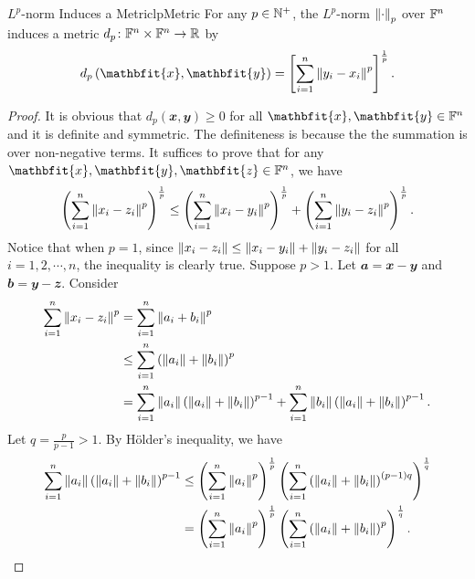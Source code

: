 \documentclass[math]{amznotes}
\theoremstyle{remark}
\begin{document}
\begin{probox}{$L^p$-norm Induces a Metric}{lpMetric}
    For any $p \in \mathbb{N}^+$, the $L^p$-norm ${\left\lVert {\cdot} \right\rVert}_p$ over $\mathbb{F}^n$ induces a metric $d_p \colon \mathbb{F}^n \times \mathbb{F}^n \to \mathbb{R}$ by 
    \begin{equation*}
        d_p\left(\mathbfit{x}, \mathbfit{y}\right) = \left[\sum_{i = 1}^{n}\norm{y_i - x_i}^p\right]^{\frac{1}{p}}.
    \end{equation*}
    \tcblower
    \begin{proof}
        It is obvious that $d_p\left(\mathbfit{x}, \mathbfit{y}\right) \geq 0$ for all $\mathbfit{x}, \mathbfit{y} \in \F^n$ and it is definite and symmetric. The definiteness is because the the summation is over non-negative terms. It suffices to prove that for any $\mathbfit{x}, \mathbfit{y}, \mathbfit{z} \in \F^n$, we have 
        \begin{equation*}
            \left( \sum_{i=1}^n {\left\lVert {x_i - z_i} \right\rVert}^p \right)^{\frac{1}{p}} \leq \left( \sum_{i=1}^n {\left\lVert {x_i - y_i} \right\rVert}^p \right)^{\frac{1}{p}} + \left( \sum_{i=1}^n {\left\lVert {y_i - z_i} \right\rVert}^p \right)^{\frac{1}{p}}.
        \end{equation*}
        Notice that when $p = 1$, since ${\left\lVert {x_i - z_i} \right\rVert} \leq {\left\lVert {x_i - y_i} \right\rVert} + {\left\lVert {y_i - z_i} \right\rVert} $ for all $i = 1, 2, \cdots, n$, the inequality is clearly true. Suppose $p > 1$. Let $\mathbfit{a} = \mathbfit{x} - \mathbfit{y}$ and $\mathbfit{b = y - z}$. Consider
        \begin{align*}
            \sum_{i=1}^n {\left\lVert {x_i - z_i} \right\rVert}^p & = \sum_{i=1}^n {\left\lVert {a_i + b_i} \right\rVert}^p \\
            & \leq \sum_{i=1}^n \left({\left\lVert {a_i} \right\rVert} + {\left\lVert {b_i} \right\rVert}\right)^p \\
            & = \sum_{i=1}^n {\left\lVert {a_i} \right\rVert}\left({\left\lVert {a_i} \right\rVert} + {\left\lVert {b_i} \right\rVert}\right)^{p - 1} + \sum_{i=1}^n {\left\lVert {b_i} \right\rVert}\left({\left\lVert {a_i} \right\rVert} + {\left\lVert {b_i} \right\rVert}\right)^{p - 1}.
        \end{align*}
        Let $q = \frac{p}{p - 1} > 1$. By H\"{o}lder's inequality, we have
        \begin{align*}
            \sum_{i=1}^n {\left\lVert {a_i} \right\rVert}\left({\left\lVert {a_i} \right\rVert} + {\left\lVert {b_i} \right\rVert}\right)^{p - 1} & \leq \left(\sum_{i=1}^n {\left\lVert {a_i} \right\rVert}^p\right)^{\frac{1}{p}}\left(\sum_{i = 1}^{n}\left({\left\lVert {a_i} \right\rVert} + {\left\lVert {b_i} \right\rVert}\right)^{\left(p - 1\right)q}\right)^{\frac{1}{q}} \\
            & = \left(\sum_{i=1}^n {\left\lVert {a_i} \right\rVert}^p\right)^{\frac{1}{p}}\left(\sum_{i = 1}^{n}\left({\left\lVert {a_i} \right\rVert} + {\left\lVert {b_i} \right\rVert}\right)^{p}\right)^{\frac{1}{q}}.
        \end{align*}

\end{proof}
\end{probox}
\end{document}
